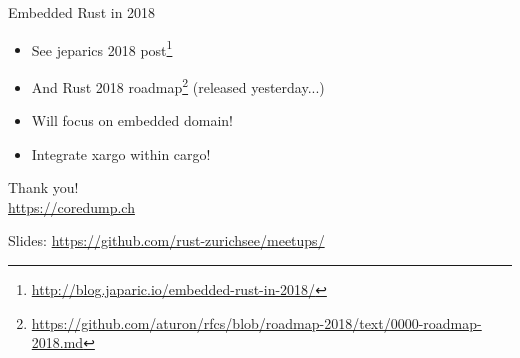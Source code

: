 \documentclass[aspectratio=1610,14pt,t]{beamer}
\begin{document}
\begin{frame}[c]{Embedded Rust in 2018}
  \begin{itemize}
    \item See jeparics 2018 post\footnote{\url{http://blog.japaric.io/embedded-rust-in-2018/}}
    \item And Rust 2018 roadmap\footnote{\url{https://github.com/aturon/rfcs/blob/roadmap-2018/text/0000-roadmap-2018.md}} (released yesterday...)
    \item<2-> Will focus on embedded domain!
    \item<2-> Integrate xargo within cargo!
  \end{itemize}
\end{frame}


{
\begin{frame}[standout]
  \begin{centering}
    {\Huge Thank you!}\\
    {\normalsize \url{https://coredump.ch}}\\
  \end{centering}
  {\small Slides: \url{https://github.com/rust-zurichsee/meetups/}}\\
  \vspace{3cm}
\end{frame}
}
\end{document}
